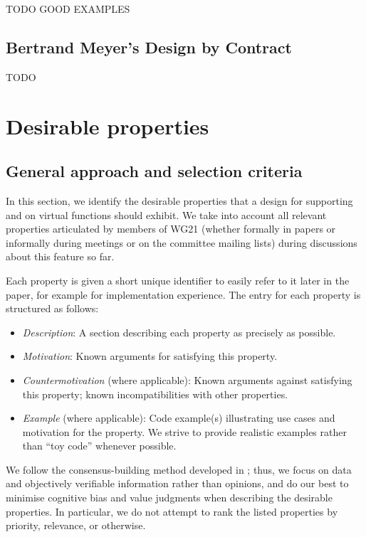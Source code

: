 TODO GOOD EXAMPLES

\subsection{Bertrand Meyer's Design by Contract}

TODO

\section{Desirable properties}
\label{properties}


\subsection{General approach and selection criteria}

In this section, we identify the desirable properties that a design for supporting  and  on virtual functions should exhibit. We take into account all relevant properties articulated by members of WG21 (whether formally in papers or informally during meetings or on the committee mailing lists)  during discussions about this feature so far.

Each property is given a short unique identifier to easily refer to it later in the paper, for example  for implementation experience. The entry for each property is structured as follows:
\begin{itemize}
\item \emph{Description}: A section describing each property as precisely as possible.
\item \emph{Motivation}: Known arguments for satisfying this property.
\item \emph{Countermotivation} (where applicable): Known arguments against satisfying this property; known incompatibilities with other properties.
\item \emph{Example} (where applicable): Code example(s) illustrating use cases and motivation for the property. We strive to provide realistic examples rather than ``toy code'' whenever possible. 
\end{itemize}
We follow the consensus-building method developed in \cite{P3099R0}; thus, we focus on data and objectively verifiable information rather than opinions, and do our best to minimise cognitive bias and value judgments when describing the desirable properties. In particular, we do not attempt to rank the listed properties by priority, relevance, or otherwise. 

